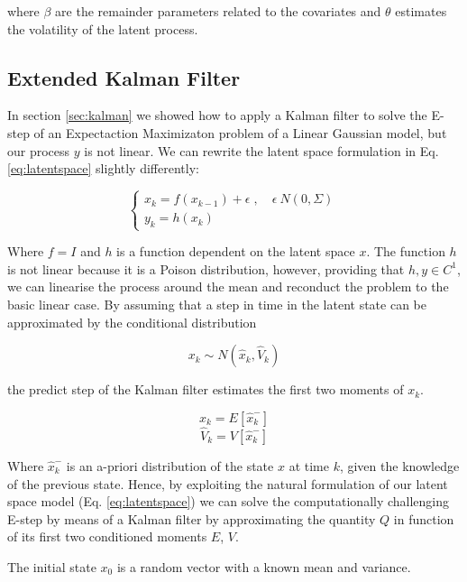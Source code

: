 \documentclass[mscthesis]{usiinfthesis}
\begin{document}
\noindent where $\beta$ are the remainder parameters related to the covariates and $\theta$ estimates the volatility of the latent process.


\subsection{Extended Kalman Filter}

In section \ref{sec:kalman} we showed how to apply a Kalman filter to solve the E-step of an Expectaction Maximizaton problem of a Linear Gaussian model, but our process $y$ is not linear. We can rewrite the latent space formulation in Eq. \ref{eq:latentspace} slightly differently:

\begin{eqfloat}
\begin{equation}
    \begin{cases}
      x_k = f(x_{k-1}) + \epsilon \; , \quad \epsilon ~ N(0, \Sigma) \\
      y_k = h(x_k) 
    \end{cases}\,
\label{eq:latentspace2}
\end{equation}
\end{eqfloat}

\noindent Where $f = I$ and $h$ is a function dependent on the latent space $x$. The function $h$ is not linear because it is a Poison distribution, however, providing that $h, y \in C^1$, we can linearise the process around the mean and reconduct the problem to the basic linear case. By assuming that a step in time in the latent state can be approximated by the conditional distribution 

\[
x_{k} \sim N( \hat{x}_k, \hat{V}_k)
\]

\noindent the predict step of the Kalman filter estimates the first two moments of $x_k$. 

\[
\hat{x}_k = E[\hat{x}^-_k]
\]
\[
\hat{V}_k = V[\hat{x}^-_k]
\]

\noindent Where $\hat{x}^-_k$  is an a-priori distribution of the state $x$ at time $k$, given the knowledge of the previous state. Hence, by exploiting the natural formulation of our latent space model (Eq. \ref{eq:latentspace}) we can solve the computationally challenging E-step by means of a Kalman filter by approximating the quantity $Q$ in function of its first two conditioned moments $E$, $V$. 

\noindent The initial state $x_0$ is a random vector with a known mean and variance.
\end{document}
